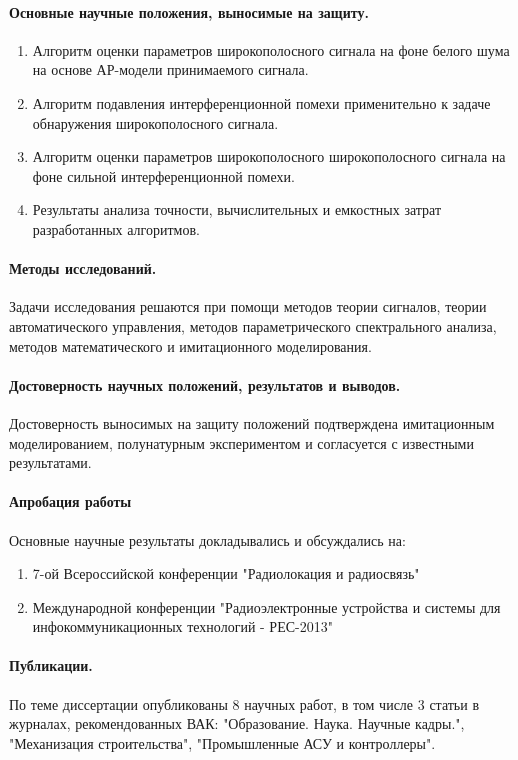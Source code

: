 \paragraph{Основные научные положения, выносимые на защиту.}
\begin{enumerate}
	\item {Алгоритм оценки параметров широкополосного сигнала на фоне белого шума на основе АР-модели принимаемого сигнала.}
	\item {Алгоритм подавления интерференционной помехи применительно к задаче обнаружения широкополосного сигнала.}
	\item {Алгоритм оценки параметров широкополосного широкополосного сигнала на фоне сильной интерференционной помехи.}
	\item {Результаты анализа точности, вычислительных и емкостных затрат разработанных алгоритмов.}
\end{enumerate}

\paragraph{Методы исследований.} Задачи исследования решаются при помощи методов теории сигналов, теории автоматического управления,
методов параметрического спектрального анализа, методов математического и имитационного моделирования.

\paragraph{Достоверность научных положений, результатов и выводов.}
Достоверность выносимых на защиту положений подтверждена имитационным моделированием, полунатурным экспериментом и согласуется
с известными результатами.

\paragraph{Апробация работы}
Основные научные результаты докладывались и обсуждались на:
\begin{enumerate}
	\item 7-ой Всероссийской конференции "Радиолокация и радиосвязь"
	\item Международной конференции "Радиоэлектронные устройства и системы для инфокоммуникационных технологий - РЕС-2013"
\end{enumerate}

\paragraph{Публикации.}
По теме диссертации опубликованы 8 научных работ, в том числе 3 статьи в журналах, рекомендованных ВАК:
"Образование. Наука. Научные кадры.", "Механизация строительства", "Промышленные АСУ и контроллеры".

